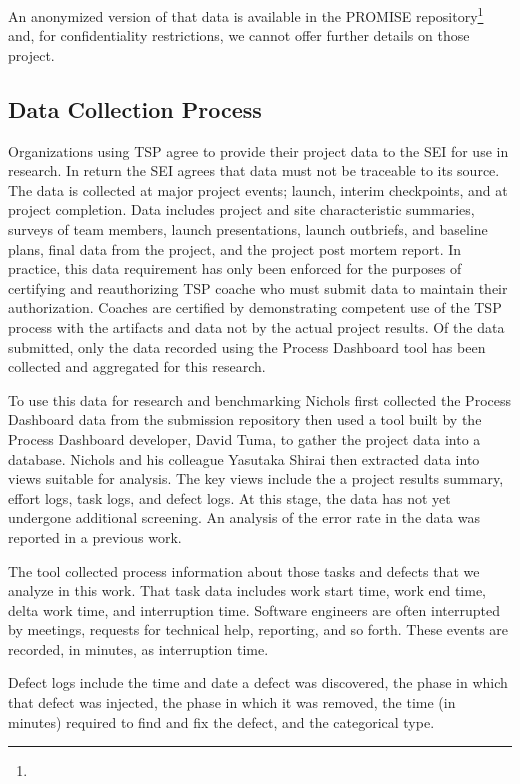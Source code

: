  An anonymized version of that data is available in the PROMISE repository\footnote{} and,
 for confidentiality restrictions, we cannot offer 
further details
on those project.  


\subsection{Data Collection Process}



Organizations using TSP agree to provide their project data to the SEI for use in research. In return the SEI agrees    that  data must not be traceable to its source. The data is collected at major project events; launch, interim checkpoints, and at project completion. Data includes project and site  characteristic summaries, surveys of team members, launch presentations, launch outbriefs, and baseline plans, final data from the project, and the project post mortem report.  In practice, this data requirement has only been enforced for the purposes of certifying and reauthorizing TSP coache who must submit data to maintain their authorization. Coaches are certified by demonstrating competent use of the TSP process with the artifacts and data not by the actual project results.  Of the data submitted, only the data recorded using the Process Dashboard tool has been collected and aggregated for this research. 

To use this data for research and benchmarking  Nichols first collected the Process Dashboard data from the submission repository then used a tool built by the Process Dashboard developer, David Tuma, 
to gather the project data into a database. Nichols and his colleague Yasutaka Shirai then extracted data into views suitable for analysis. The key views include the a project results summary, effort logs, task logs, and defect logs. At this stage, the data has not yet undergone additional screening.  An analysis of the error rate in the data was reported in a previous work. 

The tool collected process information about those tasks and defects that we analyze in this work. 
That task data includes  work start time, work end time, delta
work time, and interruption time. Software engineers are often
interrupted by meetings, requests for technical help, reporting, and
so forth. These events are recorded, in minutes, as interruption
time. 

 Defect logs include the time and date a defect was discovered, the phase in which that defect was injected, the phase in which it was removed, the time (in minutes) required to find and fix the defect, and the categorical type.

